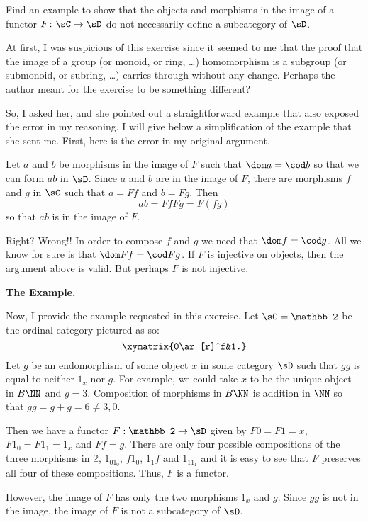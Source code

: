 \documentclass[main.tex]{subfiles}
\begin{document}
\maketitle


\begin{exercise}
Find an example to show that the objects and morphisms in the image of a functor $F \colon \sC\to\sD$ do not necessarily define a subcategory of $\sD$.
\end{exercise}

At first, I was suspicious of this exercise since it seemed to me that the proof that the image of a group (or monoid, or ring, \dots) homomorphism is a subgroup (or submonoid, or subring, \dots) carries through without any change. Perhaps the author meant for the exercise to be something different?

So, I asked her, and she pointed out a straightforward example that also exposed the error in my reasoning. I will give below a simplification of the example that she sent me. First, here is the error in my original argument.

Let $a$ and $b$ be morphisms in the image of $F$ such that $\dom a=\cod b$ so that we can form $ab$ in $\sD$. Since $a$ and $b$ are in the image of $F$, there are morphisms $f$ and $g$ in $
\sC$ such that $a=Ff$ and $b=Fg$. Then 
$$ab=FfFg=F(fg)$$
so that $ab$ is in the image of $F$. 

Right? Wrong!! In order to compose $f$ and $g$ we need that $\dom f=\cod g$. All we know for sure is that $\dom Ff=\cod Fg$. If $F$ is injective on objects, then the argument above is valid. But perhaps $F$ is not injective.

\begin{center}{\bf The Example.}\end{center}
Now, I provide the example requested in this exercise. Let $\sC={\mathbb 2}$ be the ordinal category pictured as so:
\[\xymatrix{0\ar[r]^f&1.}\]
Let $g$ be an endomorphism of some object $x$ in some category $\sD$ such that 
$gg$ is equal to neither $1_x$ nor $g$. For example, we could take $x$ to be 
the unique object in $B\NN$ and $g=3$. Composition of morphisms in $B\NN$ is 
addition in $\NN$  so that $gg=g+g=6\ne 3,0$.

Then we have a functor $F:{\mathbb 2}\rightarrow\sD$ given by $F0=F1=x$, 
$F1_0=F1_1=1_x$ and $Ff=g$. There are only four possible compositions of the 
three morphisms in ${\mathbb 2}$, $1_01_0$, $f1_0$, $1_1f$ and $1_11_1$ and it 
is easy to see that $F$ preserves all four of these compositions. Thus, $F$ is 
a functor.

However, the image of $F$ has only the two morphisms $1_x$ and $g$. Since $gg$ is not in the image, the image of $F$ is not a subcategory of $\sD$.
\end{document}
